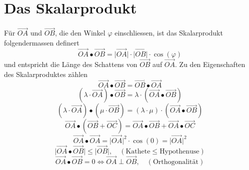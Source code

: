 \section{Das Skalarprodukt}
Für $\overrightarrow{OA}$ und $\overrightarrow{OB}$, die den Winkel $\varphi$ einschliessen, ist das Skalarprodukt folgendermassen definert
\begin{equation}
\boxed{\overrightarrow{OA}\bullet \overrightarrow{OB}=\Big\vert \overrightarrow{OA}\Big\vert\cdot \Big\vert \overrightarrow{OB}\Big\vert\cdot \cos\left(\varphi\right)}
\end{equation}
und entspricht die Länge des Schattens von $\overrightarrow{OB}$ auf $\overrightarrow{OA}$. Zu den Eigenschaften des Skalarproduktes zählen
\begin{equation}
\boxed{\overrightarrow{OA}\bullet \overrightarrow{OB}=\overrightarrow{OB}\bullet \overrightarrow{OA}}
\end{equation}
\begin{equation}
\boxed{\left(\lambda\cdot \overrightarrow{OA}\right)\bullet \overrightarrow{OB}=\lambda\cdot \left(\overrightarrow{OA}\bullet \overrightarrow{OB}\right)}
\end{equation}
\begin{equation}
\boxed{\left(\lambda\cdot\overrightarrow{OA}\right)\bullet \left(\mu\cdot\overrightarrow{OB}\right)=\left(\lambda\cdot \mu\right)\cdot \left(\overrightarrow{OA}\bullet \overrightarrow{OB}\right)}
\end{equation}
\begin{equation}
\boxed{\overrightarrow{OA}\bullet \left(\overrightarrow{OB}+\overrightarrow{OC}\right)=\overrightarrow{OA}\bullet \overrightarrow{OB}+\overrightarrow{OA}\bullet \overrightarrow{OC}}
\end{equation}
\begin{equation}
\boxed{\overrightarrow{OA}\bullet \overrightarrow{OA}=\Big\vert\overrightarrow{OA}\Big\vert^2\cdot \cos\left(0\right)=\Big\vert\overrightarrow{OA}\Big\vert^2}
\end{equation}
\begin{equation}
\boxed{\Big\vert\overrightarrow{OA}\bullet\overrightarrow{OB}\Big\vert\leq\Big\vert\overrightarrow{OB}\Big\vert,\quad (\text{Kathete}\leq\text{Hypothenuse})}
\end{equation}
\begin{equation}
\boxed{\overrightarrow{OA}\bullet \overrightarrow{OB}=0\Leftrightarrow \overrightarrow{OA}\perp \overrightarrow{OB},\quad (\text{Orthogonalität})}
\end{equation}
